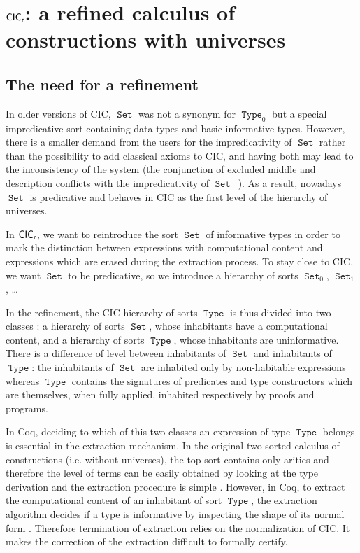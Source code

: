 \documentclass[a4paper,USenglish]{lipics}
\DeclareMathOperator{\Type}{\mathtt{Type}}
\DeclareMathOperator{\Set}{\mathtt{Set}}
\def\coq{\textsf{Coq}\xspace}
\def\cic{\textsf{CIC}\xspace}
\def\cicr{$\text{\textsf{CIC}}_{\text{\textsf{r}}}$\xspace}
\begin{document}
\section{\label{Calculus}\cicr: a refined calculus of constructions with universes}

\subsection{The need for a refinement}

In older versions of \cic, $\Set$ was not a synonym for $\Type_0$ but a
special impredicative sort containing data-types and basic informative
types. However, there is a smaller demand from the users for the
impredicativity of $\Set$ rather than the possibility to add classical
axioms to \cic, and having both may lead to the inconsistency of the
system (the conjunction of excluded middle and description conflicts with
the impredicativity of $\Set$~\cite{Geuvers01}). As a result, nowadays $\Set$
is predicative and behaves in \cic as the first level of the hierarchy of
universes.

In \cicr, we want to reintroduce the sort $\Set$ of
informative types in order to mark the distinction between
expressions with computational content and expressions
which are erased during the extraction process. To stay close to \cic, we
want $\Set$ to be predicative, so we introduce a hierarchy of
sorts $\Set_0$, $\Set_1$, \dots

In the refinement, the \cic hierarchy of sorts $\Type$ is thus divided
into two classes : a hierarchy of sorts $\Set$, whose inhabitants have a
  computational content, and a hierarchy of sorts $\Type$, whose inhabitants are uninformative.
There is a difference of level between inhabitants
of $\Set$ and inhabitants of $\Type$:
the inhabitants of $\Set$ are inhabited only by non-habitable expressions
whereas $\Type$ contains the
signatures of predicates and type constructors which are
themselves, when fully applied, inhabited respectively by proofs and
programs.

In \coq, deciding to which of this two classes an expression of type
$\Type$ belongs is essential in the extraction mechanism.  In the original
two-sorted calculus of constructions (i.e. without universes), the
top-sort contains only arities and therefore the level of terms can be easily
obtained by looking at the type derivation and the extraction procedure is
simple \cite{DBLP:conf/popl/Paulin-Mohring89}. However, in \coq, to extract the
computational content of an inhabitant of sort $\Type$, the extraction
algorithm decides if a type is informative by inspecting the shape of its
normal form \cite{letouzey04, DBLP:conf/cie/Letouzey08}.
Therefore termination of extraction relies on the normalization of
\cic. It makes the correction of the extraction difficult to formally certify.
\end{document}
